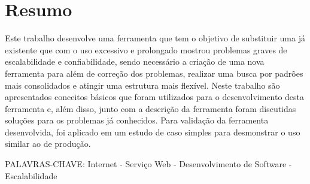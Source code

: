 \chapter*{Resumo}
\label{resumo}
Este trabalho desenvolve uma ferramenta que tem o objetivo de substituir uma já existente que com o uso excessivo e prolongado mostrou problemas graves de escalabilidade e confiabilidade, sendo necessário a criação de uma nova ferramenta para além de correção dos problemas, realizar uma busca por padrões mais consolidados e atingir uma estrutura mais flexível. Neste trabalho são apresentados conceitos básicos que foram utilizados para o desenvolvimento desta ferramenta e, além disso, junto com a descrição da ferramenta foram discutidas soluções para os problemas já conhecidos. Para validação da ferramenta desenvolvida,  foi aplicado em um estudo de caso simples para desmonstrar o uso similar ao de produção.

\vspace{0.5cm}
PALAVRAS-CHAVE: Internet - Serviço Web - Desenvolvimento de Software - Escalabilidade